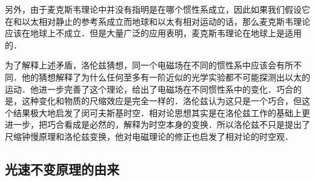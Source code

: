 另外，由于麦克斯韦理论中并没有指明是在哪个惯性系成立，因此如果我们假设它在和以太相对静止的参考系成立而地球和以太有相对运动的话，那么麦克斯韦理论应该在地球上不成立．但是大量广泛的应用表明，麦克斯韦理论在地球上是适用的．

为了解释上述矛盾，洛伦兹猜想，同一个电磁场在不同的惯性系中应该会有所不同．他的猜想解释了为什么任何至多有一阶近似的光学实验都不可能探测出以太的运动．他进一步完善了这个理论，给出了电磁场在不同惯性系中的变化．巧合的是，这种变化和物质的尺缩效应是完全一样的．洛伦兹认为这只是一个巧合，但这个结果极大地启发了闵可夫斯基时空．相对论思想其实是在洛伦兹工作的基础上更进一步，把巧合看成是必然的，解释为时空本身的变换．所以洛伦兹不只是提出了尺缩钟慢原理和洛伦兹变换，他对电磁理论的修正也启发了相对论的时空观．

\subsection{光速不变原理的由来}



